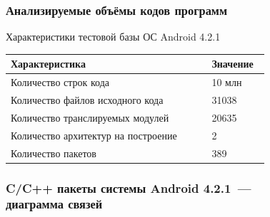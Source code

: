 \documentclass[hyperref={pdfpagelabels=false},10pt,gray]{beamer}
\begin{document}
\begin{frame}
\frametitle{Анализируемые объёмы кодов программ}
Характеристики тестовой базы ОС Android 4.2.1
\begin{table} [htbp]
  \centering
  \parbox{15cm}{\label{table:android-char}}
  \begin{tabular}{| p{0.7\linewidth} || p{0.2\linewidth} |}
  \hline
  \hline
  \textbf{Характеристика}   & \textbf{Значение} \\
  \hline
  \hline
  Количество строк кода   & 10 млн \\
  \hline
  Количество файлов исходного кода      & 31038    \\
  \hline
  Количество транслируемых модулей  & 20635   \\
  \hline
  Количество архитектур на построение & 2   \\
  \hline
  Количество пакетов & 389 \\
  \hline
  \hline
  \end{tabular}
\end{table}
\end{frame}
\begin{frame}
\frametitle{C/C++ пакеты системы Android 4.2.1~---\\диаграмма связей}
\begin{figure}[h]
\end{figure}
\end{frame}
\end{document}
